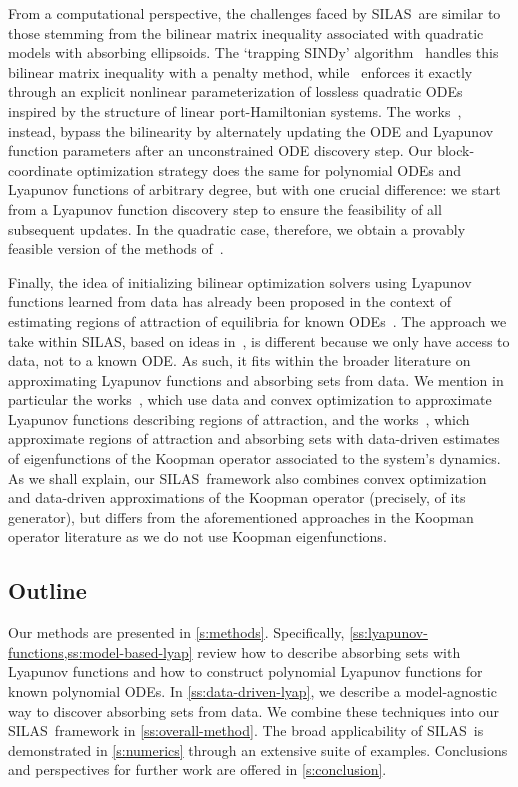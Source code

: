 \documentclass[11pt]{amsart}
\numberwithin{equation}{section}
\theoremstyle{plain}
\theoremstyle{definition}
\theoremstyle{remark}
\newcommand{\methodname}{{SILAS}}
\begin{document}
From a computational perspective, the challenges faced by \methodname\ are similar to those stemming from the bilinear matrix inequality associated with quadratic models with absorbing ellipsoids. The `trapping SINDy' algorithm~\cite{kaptanoglu2021} handles this bilinear matrix inequality with a penalty method, while~\cite{GOYAL2025134893} enforces it exactly through an explicit nonlinear parameterization of lossless quadratic ODEs inspired by the structure of linear port-Hamiltonian systems.
The works~\cite{liao2025lossless,heide2025}, instead, bypass the bilinearity by alternately updating the ODE and Lyapunov function parameters after an unconstrained ODE discovery step. Our block-coordinate optimization strategy does the same for polynomial ODEs and Lyapunov functions of arbitrary degree, but with one crucial difference: we start from a Lyapunov function discovery step to ensure the feasibility of all subsequent updates. In the quadratic case, therefore, we obtain a provably feasible version of the methods of~\cite{heide2025}.

Finally, the idea of initializing bilinear optimization solvers using Lyapunov functions learned from data has already been proposed in the context of estimating regions of attraction of equilibria for known ODEs~\cite{Topcu2008}. The approach we take within \methodname, based on ideas in~\cite{Bramburger2024}, is different because we only have access to data, not to a known ODE. As such, it fits within the broader literature on approximating Lyapunov functions and absorbing sets from data. We mention in particular the works~\cite{Korda2020,Tacchi2025}, which use data and convex optimization to approximate Lyapunov functions describing regions of attraction, 
and the works~\cite{mauroy2023,Mauroy2020}, which approximate regions of attraction and absorbing sets with data-driven estimates of eigenfunctions of the Koopman operator associated to the system's dynamics. As we shall explain, our \methodname\ framework also combines convex optimization and data-driven approximations of the Koopman operator (precisely, of its generator), but differs from the aforementioned approaches in the Koopman operator literature as we do not use Koopman eigenfunctions.

\subsection{Outline}

Our methods are presented in \cref{s:methods}. 
Specifically, \cref{ss:lyapunov-functions,ss:model-based-lyap} review how to describe absorbing sets with Lyapunov functions and how to construct polynomial Lyapunov functions for known polynomial ODEs. In \cref{ss:data-driven-lyap}, we describe a model-agnostic way to discover absorbing sets from data. We combine these techniques into our \methodname\ framework in \cref{ss:overall-method}. The broad applicability of \methodname\ is demonstrated in \cref{s:numerics} through an extensive suite of examples. Conclusions and perspectives for further work are offered in \cref{s:conclusion}.
\end{document}
